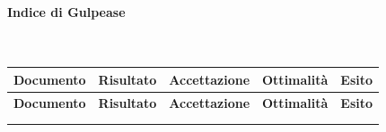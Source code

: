 \paragraph{Indice di Gulpease}\mbox{}\\
\begin{longtable}{|c|c|c|c|c|}
	\hline \multicolumn{1}{|c|}{\textbf{Documento}} & \multicolumn{1}{c|}{\textbf{Risultato}} & \multicolumn{1}{c|}{\textbf{Accettazione}} & \multicolumn{1}{c|}{\textbf{Ottimalità}} & \multicolumn{1}{c|}{\textbf{Esito}}\\
	\hline 
	\endfirsthead
	
	\hline \multicolumn{1}{|c|}{\textbf{Documento}} & \multicolumn{1}{c|}{\textbf{Risultato}} & \multicolumn{1}{c|}{\textbf{Accettazione}} & \multicolumn{1}{c|}{\textbf{Ottimalità}} & \multicolumn{1}{c|}{\textbf{Esito}}\\
	\hline 
	\endhead
	
	\hline \multicolumn{5}{|r|}{\ToBeContinued} \\ 
	\hline
	\endfoot
	
	\endlastfoot
	

\end{longtable}
